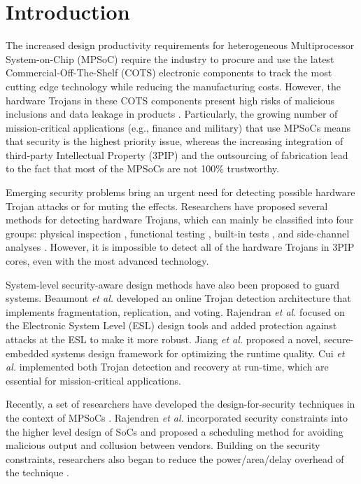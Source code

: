 \documentclass[conference]{IEEEtran}
\begin{document}
\section{Introduction}

The increased design productivity requirements for heterogeneous Multiprocessor System-on-Chip (MPSoC) require the industry to procure and use the latest Commercial-Off-The-Shelf (COTS) electronic components to track the most cutting edge technology while reducing the manufacturing costs. However, the hardware Trojans in these COTS components present high risks of malicious inclusions and data leakage in products \cite{conference:XW}. Particularly, the growing number of mission-critical applications (e.g., finance and military) that use MPSoCs means that security is the highest priority issue, whereas the increasing integration of third-party Intellectual Property (3PIP) and the outsourcing of fabrication lead to the fact that most of the MPSoCs are not 100\% trustworthy.

Emerging security problems bring an urgent need for detecting possible hardware Trojan attacks or for muting the effects. Researchers have proposed several methods for detecting hardware Trojans, which can mainly be classified into four groups: physical inspection \cite{network:SS}, functional testing \cite{conference:MM}, built-in tests \cite{conference:KX}, and side-channel analyses \cite{article:FK}. However, it is impossible to detect all of the hardware Trojans in 3PIP cores, even with the most advanced technology.

System-level security-aware design methods have also been proposed to guard systems. Beaumont \textit{et al.} \cite{conference:MB} developed an online Trojan detection architecture that implements fragmentation, replication, and voting. Rajendran \textit{et al.} \cite{article:JR} focused on the Electronic System Level (ESL) design tools and added protection against attacks at the ESL to make it more robust. Jiang \textit{et al.} \cite{conference:KJ} proposed a novel, secure-embedded systems design framework for optimizing the runtime quality. Cui \textit{et al.} \cite{conference:XC} implemented both Trojan detection and recovery at run-time, which are essential for mission-critical applications.

Recently, a set of researchers have developed the design-for-security techniques in the context of MPSoCs \cite{article:JR3} \cite{article:CL}. Rajendren \textit{et al.} \cite{conference:JR2} incorporated security constraints into the higher level design of SoCs and proposed a scheduling method for avoiding malicious output and collusion between vendors. Building on the security constraints, researchers also began to reduce the power/area/delay overhead of the technique \cite{article:NW} \cite{conference:AS}.
\end{document}
